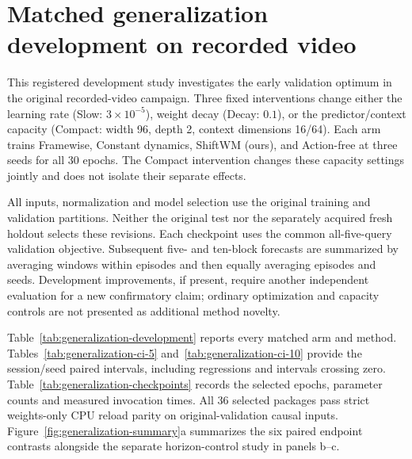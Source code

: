 \section{Matched generalization development on recorded video}
\label{app:generalization-development}
This registered development study investigates the early validation optimum in
the original recorded-video campaign. Three fixed interventions change either
the learning rate (Slow: $3\times10^{-5}$), weight decay (Decay: $0.1$), or the
predictor/context capacity (Compact: width 96, depth 2, context dimensions 16/64).
Each arm trains Framewise, Constant dynamics, ShiftWM (ours), and Action-free at
three seeds for all 30 epochs. The Compact intervention changes these capacity
settings jointly and does not isolate their separate effects.

All inputs, normalization and model selection use the original training and
validation partitions. Neither the original test nor the separately acquired
fresh holdout selects these revisions. Each checkpoint uses the common
all-five-query validation objective. Subsequent five- and ten-block forecasts
are summarized by averaging windows within episodes and then equally averaging
episodes and seeds. Development improvements, if present, require another
independent evaluation for a new confirmatory claim; ordinary optimization and
capacity controls are not presented as additional method novelty.

Table~\ref{tab:generalization-development} reports every matched arm and method.
Tables~\ref{tab:generalization-ci-5} and~\ref{tab:generalization-ci-10} provide
the session/seed paired intervals, including regressions and intervals crossing
zero. Table~\ref{tab:generalization-checkpoints} records the selected epochs,
parameter counts and measured invocation times. All 36 selected packages pass
strict weights-only CPU reload parity on original-validation causal inputs.
Figure~\ref{fig:generalization-summary}a summarizes the six paired endpoint
contrasts alongside the separate horizon-control study in panels b--c.




